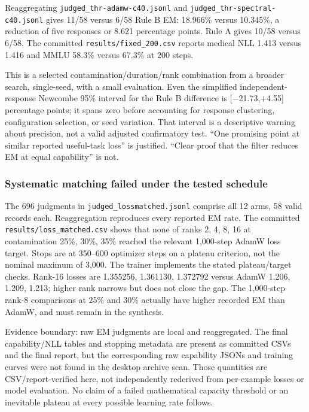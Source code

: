 \documentclass[
  british,
  10pt,
  a4paper,
]{article}
\newcounter{none} %
\begin{document}
Reaggregating
\texttt{judged\_\allowbreak{}thr-\allowbreak{}adamw-\allowbreak{}c40.\allowbreak{}jsonl}
and
\texttt{judged\_\allowbreak{}thr-\allowbreak{}spectral-\allowbreak{}c40.\allowbreak{}jsonl}
gives 11/58 versus 6/58 Rule B EM: 18.966\% versus 10.345\%, a reduction
of five responses or 8.621 percentage points. Rule A gives 10/58 versus
6/58. The committed
\texttt{results/\allowbreak{}fixed\_\allowbreak{}200.\allowbreak{}csv}
reports medical NLL 1.413 versus 1.416 and MMLU 58.3\% versus 67.3\% at
200 steps.

This is a selected
contaminatio\allowbreak{}n/\allowbreak{}duration/\allowbreak{}rank
combination from a broader search,
single-\allowbreak{}seed,\allowbreak{} with a small
evaluation.\allowbreak{} Even the simplified independent-\allowbreak{}
response Newcombe 95\% interval for the Rule B difference is
[−21.\allowbreak{}73,\allowbreak{}+4.\allowbreak{}55] percentage points;
it spans zero before accounting for response clustering,\allowbreak{}
configuration selection, or seed variation. That interval is a
descriptive warning about precision, not a valid adjusted confirmatory
test. ``One promising point at similar reported useful-\allowbreak{}task
loss'' is justified. ``Clear proof that the filter reduces EM at equal
capability'' is not.

\subsubsection{Systematic matching failed under the tested
schedule}\label{em-results-audit--systematic-matching-failed-under-the-tested-schedule}

The 696 judgments in
\texttt{judged\_\allowbreak{}lossmatched.\allowbreak{}jsonl} comprise
all 12 arms, 58 valid records each. Reaggregation reproduces every
reported EM rate. The committed
\texttt{results/\allowbreak{}loss\_\allowbreak{}matched.\allowbreak{}csv}
shows that none of ranks 2, 4, 8, 16 at contamination 25\%, 30\%, 35\%
reached the relevant 1,000-step AdamW loss target. Stops are at 350--600
optimizer steps on a plateau criterion, not the nominal maximum of
3,000. The trainer implements the stated plateau/\allowbreak{}target
checks. Rank-16 losses are 1.355256, 1.361130, 1.372792 versus AdamW
1.206, 1.209, 1.213; higher rank narrows but does not close the gap. The
1,000-step rank-8 comparisons at 25\% and 30\% actually have higher
recorded EM than AdamW, and must remain in the synthesis.

Evidence boundary: raw EM judgments are local and
reaggregated\allowbreak{}.\allowbreak{} The final
capability/\allowbreak{}NLL tables and stopping metadata are present as
committed CSVs and the final report, but the corresponding raw
capability JSONs and training curves were not found in the desktop
archive scan. Those quantities are
CSV/\allowbreak{}report-\allowbreak{}verified here, not independently
rederived from per-\allowbreak{}example losses or model
evaluation.\allowbreak{} No claim of a failed mathematical capacity
threshold or an inevitable plateau at every possible learning rate
follows.
\end{document}
